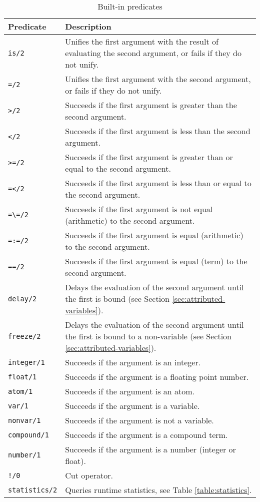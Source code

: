 \begin{appendices}
\begin{table}
\centering
\begin{tabular}{lp{12cm}}
\hline
\textbf{Predicate} & \textbf{Description} \\
\hline
\texttt{is/2} & Unifies the first argument with the result of evaluating the second argument, or fails if they do not unify. \\
\texttt{=/2} & Unifies the first argument with the second argument, or fails if they do not unify. \\
\texttt{>/2} & Succeeds if the first argument is greater than the second argument. \\
\texttt{</2} & Succeeds if the first argument is less than the second argument. \\
\texttt{>=/2} & Succeeds if the first argument is greater than or equal to the second argument. \\
\texttt{=</2} & Succeeds if the first argument is less than or equal to the second argument. \\
\texttt{=\textbackslash=/2} & Succeeds if the first argument is not equal (arithmetic) to the second argument. \\
\texttt{=:=/2} & Succeeds if the first argument is equal (arithmetic) to the second argument. \\
\texttt{==/2} & Succeeds if the first argument is equal (term) to the second argument. \\
\texttt{delay/2} & Delays the evaluation of the second argument until the first is bound (see Section \ref{sec:attributed-variables}). \\
\texttt{freeze/2} & Delays the evaluation of the second argument until the first is bound to a non-variable (see Section \ref{sec:attributed-variables}). \\
\texttt{integer/1} & Succeeds if the argument is an integer. \\
\texttt{float/1} & Succeeds if the argument is a floating point number. \\
\texttt{atom/1} & Succeeds if the argument is an atom. \\
\texttt{var/1} & Succeeds if the argument is a variable. \\
\texttt{nonvar/1} & Succeeds if the argument is not a variable. \\
\texttt{compound/1} & Succeeds if the argument is a compound term. \\
\texttt{number/1} & Succeeds if the argument is a number (integer or float). \\
\texttt{!/0} & Cut operator. \\
\texttt{statistics/2} & Queries runtime statistics, see Table \ref{table:statistics}. \\
\hline
\end{tabular}
\caption{Built-in predicates}
\label{table:predicates}
\end{table}


\end{appendices}
